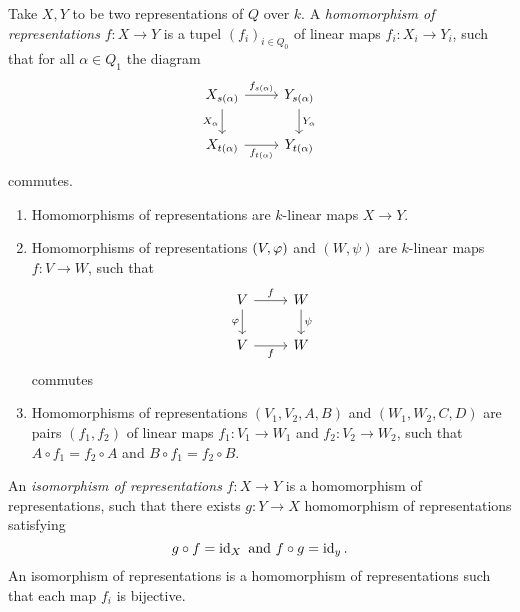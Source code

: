 \begin{defn}
  Take $X,Y$ to be two representations of $Q$ over $k$. A \emph{homomorphism of representations}  $f:X\to Y$ is a tupel $(f_i)_{i\in Q_0}$ of linear maps $f_i:X_i\to Y_i$, such that for all $\alpha \in Q_1$ the diagram
  \[
  \begin{tikzcd}
    X_{s(\alpha)}\ar{r}{f_{s(\alpha)}} \ar[swap]{d}{X_\alpha}&Y_{s(\alpha)}\ar{d}{Y_{\alpha}}\\
    X_{t(\alpha)}\ar[swap]{r}{f_{t(\alpha)}} & Y_{t(\alpha)}
  \end{tikzcd}
  \] commutes.
\end{defn}
\begin{bsp}
  \begin{enumerate}
    \item Homomorphisms of representations are $k$-linear maps $X\to Y$.
    \item Homomorphisms of representations $(V,\varphi)$ and $(W,\psi)$ are $k$-linear maps $f:V\to W$, such that
    \[
    \begin{tikzcd}
      V\ar{r}{f}\ar[swap]{d}{\pphi}&W\ar{d}{\psi}\\
      V\ar[swap]{r}{f}&W
    \end{tikzcd}
  \] commutes
    \item Homomorphisms of representations $(V_1,V_2,A,B)$ and $(W_1,W_2,C,D)$ are pairs $(f_1,f_2)$ of linear maps $f_1:V_1\to W_1$ and $f_2:V_2\to W_2$, such that $A\circ f_1=f_2\circ A$ and $B\circ f_1=f_2\circ B$.
  \end{enumerate}
\end{bsp}
\begin{defn}
  An \emph{isomorphism of representations} $f:X\to Y$ is a homomorphism of representations, such that there exists $g:Y\to X$ homomorphism of representations satisfying
  \[
  g\circ f=\operatorname{id}_X~\text{and}~f\circ g=\operatorname{id}_y.
  \]
  An isomorphism of representations is a homomorphism of representations such that each map $f_i$ is bijective.

\end{defn}

\lec
